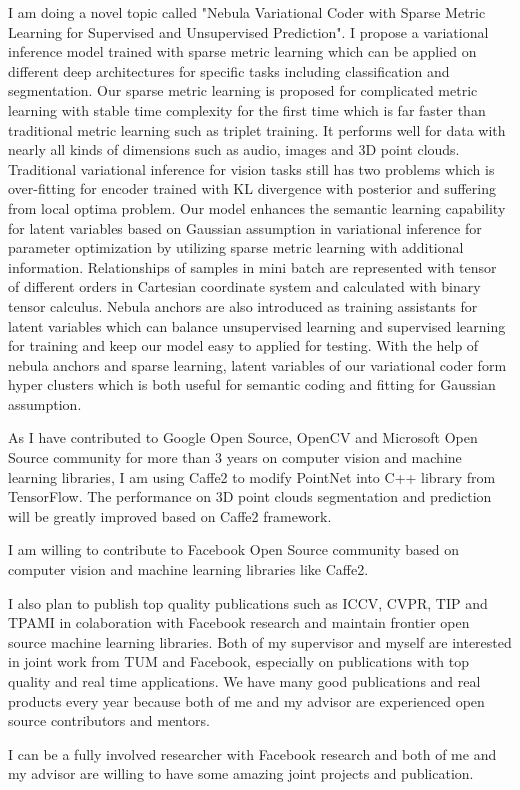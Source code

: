 \documentclass[11pt, a4paper]{awesome-cv} %
\begin{document}
I am doing a novel topic called "Nebula Variational Coder with Sparse Metric Learning for Supervised and Unsupervised Prediction".
  I propose a variational inference model trained with sparse metric learning which can be applied on different deep architectures for specific tasks including classification and segmentation. 
  Our sparse metric learning is proposed for complicated metric learning with stable time complexity for the first time which is far faster than traditional metric learning such as triplet training. 
  It performs well for data with nearly all kinds of dimensions such as audio, images and 3D point clouds.
  Traditional variational inference for vision tasks still has two problems which is over-fitting for encoder trained with KL divergence with posterior and suffering from local optima problem.
  Our model enhances the semantic learning capability for latent variables based on Gaussian assumption in variational inference for parameter optimization by utilizing sparse metric learning with additional information. 
  Relationships of samples in mini batch are represented with tensor of different orders in Cartesian coordinate system and calculated with binary tensor calculus. 
  Nebula anchors are also introduced as training assistants for latent variables which can balance unsupervised learning and supervised learning for training and keep our model easy to applied for testing. 
  With the help of nebula anchors and sparse learning, latent variables of our variational coder form hyper clusters which is both useful for semantic coding and fitting for Gaussian assumption.


As I have contributed to Google Open Source, OpenCV and Microsoft Open Source community for more than 3 years on computer vision and machine learning libraries, I am using Caffe2 to modify PointNet into C++ library from TensorFlow. The performance on 3D point clouds segmentation and prediction will be greatly improved based on Caffe2 framework.

I am willing to contribute to Facebook Open Source community based on computer vision and machine learning libraries like Caffe2.

I also plan to publish top quality publications such as ICCV, CVPR, TIP and TPAMI in colaboration with Facebook research and maintain frontier open source machine learning libraries. Both of my supervisor and myself are interested in joint work from TUM and Facebook, especially on publications with top quality and real time applications. We have many good publications and real products every year because both of me and my advisor are experienced open source contributors and mentors.

I can be a fully involved researcher with Facebook research and both of me and my advisor are willing to have some amazing joint projects and publication.
\end{document}
